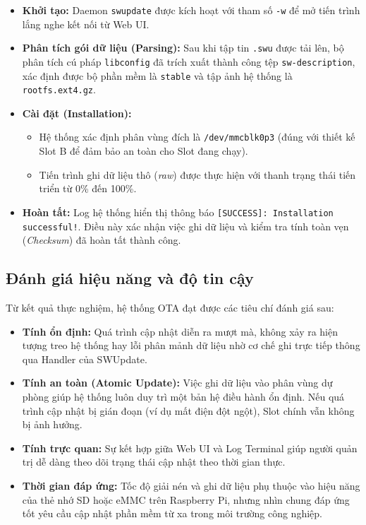 \begin{itemize}
    \item \textbf{Khởi tạo:} Daemon \texttt{swupdate} được kích hoạt với tham số \texttt{-w} để mở tiến trình lắng nghe kết nối từ Web UI.

    \item \textbf{Phân tích gói dữ liệu (Parsing):} Sau khi tập tin \texttt{.swu} được tải lên, bộ phân tích cú pháp \texttt{libconfig} đã trích xuất thành công tệp \texttt{sw-description}, xác định được bộ phần mềm là \texttt{stable} và tập ảnh hệ thống là \texttt{rootfs.ext4.gz}.

    \item \textbf{Cài đặt (Installation):}
    \begin{itemize}
        \item Hệ thống xác định phân vùng đích là \texttt{/dev/mmcblk0p3} (đúng với thiết kế Slot B để đảm bảo an toàn cho Slot đang chạy).
        \item Tiến trình ghi dữ liệu thô (\textit{raw}) được thực hiện với thanh trạng thái tiến triển từ 0\% đến 100\%.
    \end{itemize}

    \item \textbf{Hoàn tất:} Log hệ thống hiển thị thông báo \texttt{[SUCCESS]: Installation successful!}. Điều này xác nhận việc ghi dữ liệu và kiểm tra tính toàn vẹn (\textit{Checksum}) đã hoàn tất thành công.
\end{itemize}

\subsection{Đánh giá hiệu năng và độ tin cậy}

Từ kết quả thực nghiệm, hệ thống OTA đạt được các tiêu chí đánh giá sau:

\begin{itemize}
    \item \textbf{Tính ổn định:} Quá trình cập nhật diễn ra mượt mà, không xảy ra hiện tượng treo hệ thống hay lỗi phân mảnh dữ liệu nhờ cơ chế ghi trực tiếp thông qua Handler của SWUpdate.

    \item \textbf{Tính an toàn (Atomic Update):} Việc ghi dữ liệu vào phân vùng dự phòng giúp hệ thống luôn duy trì một bản hệ điều hành ổn định. Nếu quá trình cập nhật bị gián đoạn (ví dụ mất điện đột ngột), Slot chính vẫn không bị ảnh hưởng.

    \item \textbf{Tính trực quan:} Sự kết hợp giữa Web UI và Log Terminal giúp người quản trị dễ dàng theo dõi trạng thái cập nhật theo thời gian thực.

    \item \textbf{Thời gian đáp ứng:} Tốc độ giải nén và ghi dữ liệu phụ thuộc vào hiệu năng của thẻ nhớ SD hoặc eMMC trên Raspberry Pi, nhưng nhìn chung đáp ứng tốt yêu cầu cập nhật phần mềm từ xa trong môi trường công nghiệp.
\end{itemize}

